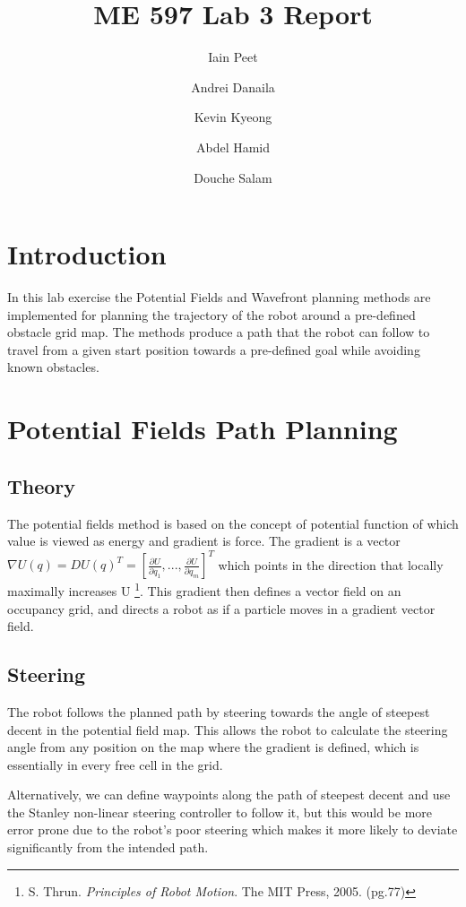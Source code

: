 \documentclass[11pt]{article} %
\title{ME 597 Lab 3 Report}
\author{Iain Peet \and Andrei Danaila \and Kevin Kyeong \and Abdel Hamid \and Douche Salam}
\begin{document}
\maketitle

\clearpage

\section*{Introduction}
In this lab exercise the Potential Fields and Wavefront planning methods are implemented for planning the trajectory of the robot around a pre-defined obstacle grid map. The methods produce a path that the robot can follow to travel from a given start position towards a pre-defined goal while avoiding known obstacles.

\section{Potential Fields Path Planning}
\subsection{Theory}
The potential fields method is based on the concept of potential function of which value is viewed as energy and gradient is force.  The gradient is a vector $\nabla U(q) = DU(q)^T = [\frac{\partial U}{\partial q_1}, . . . , \frac{\partial U}{\partial q_m}]^T$ which points in the direction that locally maximally increases U \footnote{S. Thrun. \emph{Principles of Robot Motion}. The MIT Press, 2005. (pg.77)}.  This gradient then defines a vector field on an occupancy grid, and directs a robot as if a particle moves in a gradient vector field.

\subsection{Steering}
The robot follows the planned path by steering towards the angle of steepest decent in the potential field map. This allows the robot to calculate the steering angle from any position on the map where the gradient is defined, which is essentially in every free cell in the grid.

Alternatively, we can define waypoints along the path of steepest decent and use the Stanley non-linear steering controller to follow it, but this would be more error prone due to the robot's poor steering which makes it more likely to deviate significantly from the intended path.
\end{document}
